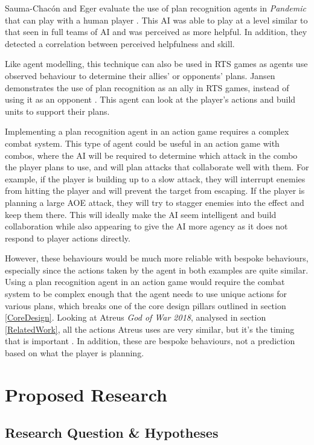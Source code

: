 \documentclass{IEEEtran}
\begin{document}
Sauma-Chacón and Eger evaluate the use of plan recognition agents in \textit{Pandemic} that can play with a human player \cite{PandemicPlanRecognition2021}. This AI was able to play at a level similar to that seen in full teams of AI and was perceived as more helpful. In addition, they detected a correlation between perceived helpfulness and skill.

Like agent modelling, this technique can also be used in RTS games as agents use observed behaviour to determine their allies' or opponents' plans. Jansen demonstrates the use of plan recognition as an ally in RTS games, instead of using it as an opponent \cite{PlayerAdaptiveRTSAI2007}. This agent can look at the player's actions and build units to support their plans.

Implementing a plan recognition agent in an action game requires a complex combat system. This type of agent could be useful in an action game with combos, where the AI will be required to determine which attack in the combo the player plans to use, and will plan attacks that collaborate well with them. For example, if the player is building up to a slow attack, they will interrupt enemies from hitting the player and will prevent the target from escaping. If the player is planning a large AOE attack, they will try to stagger enemies into the effect and keep them there. This will ideally make the AI seem intelligent and build collaboration while also appearing to give the AI more agency as it does not respond to player actions directly.

However, these behaviours would be much more reliable with bespoke behaviours, especially since the actions taken by the agent in both examples are quite similar. Using a plan recognition agent in an action game would require the combat system to be complex enough that the agent needs to use unique actions for various plans, which breaks one of the core design pillars outlined in section \ref{CoreDesign}. Looking at Atreus \textit{God of War 2018}, analysed in section \ref{RelatedWork}, all the actions Atreus uses are very similar, but it’s the timing that is important \cite{GDCAtreus}. In addition, these are bespoke behaviours, not a prediction based on what the player is planning.

\section{Proposed Research}
\label{ProposedResearch}

\subsection{Research Question \& Hypotheses}
\label{Hypotheses}
\end{document}
